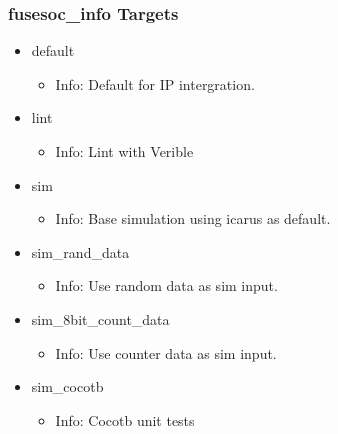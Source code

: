 \subsubsection{fusesoc\_info Targets}
\begin{itemize}
\item default
	\begin{itemize}
	\item[$\space$] Info: Default for IP intergration.
	\end{itemize}
\item lint
	\begin{itemize}
	\item[$\space$] Info: Lint with Verible
	\end{itemize}
\item sim
	\begin{itemize}
	\item[$\space$] Info: Base simulation using icarus as default.
	\end{itemize}
\item sim\_rand\_data
	\begin{itemize}
	\item[$\space$] Info: Use random data as sim input.
	\end{itemize}
\item sim\_8bit\_count\_data
	\begin{itemize}
	\item[$\space$] Info: Use counter data as sim input.
	\end{itemize}
\item sim\_cocotb
	\begin{itemize}
	\item[$\space$] Info: Cocotb unit tests
	\end{itemize}
\end{itemize}
